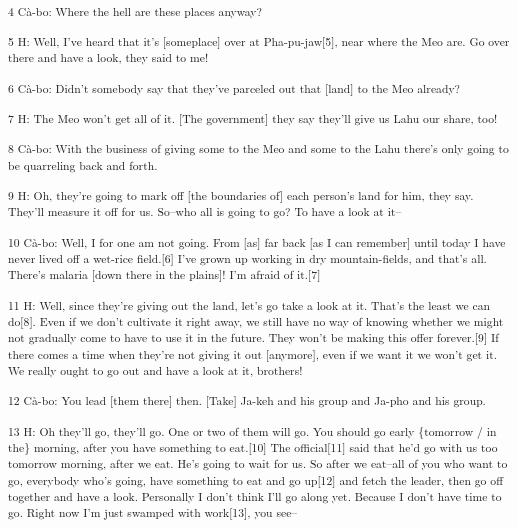 {\textsuperscript{4 Cà-bo: Where the hell are these places anyway?}}

{\textsuperscript{5 H: Well, I've heard that it's [someplace] over at Pha-pu-jaw[5],
near where the Meo are. Go over there and have a look, they said to me!}}

{\textsuperscript{6 Cà-bo: Didn't somebody say that they've parceled out
that [land] to the Meo already?}}

{\textsuperscript{7 H: The Meo won't get all of it. [The government] they
say they'll give us Lahu our share, too! }}

{\textsuperscript{8 Cà-bo: With the business of giving some to the Meo
and some to the Lahu there's only going to be quarreling back and forth.}}

{\textsuperscript{9 H: Oh, they're going to mark off [the boundaries of]
each person's land for him, they say. They'll measure it off for us. So--who all
is going to go? To have a look at it--}}

{\textsuperscript{10 Cà-bo: Well, I for one am not going. From [as] far
back [as I can remember] until today I have never lived off a wet-rice field.[6]
I've grown up working in dry mountain-fields, and that's all. There's malaria [down
there in the plains]! I'm afraid of it.[7]}}

{\textsuperscript{11 H: Well, since they're giving out the land, let's go
take a look at it. That's the least we can do[8]. Even if we don't cultivate it
right away, we still have no way of knowing whether we might not gradually come
to have to use it in the future. They won't be making this offer forever.[9] If
there comes a time when they're not giving it out [anymore], even if we want it
we won't get it. We really ought to go out and have a look at it, brothers!}}

{\textsuperscript{12 Cà-bo: You lead [them there] then. [Take] Ja-keh and
his group and Ja-pho and his group.}}

{\textsuperscript{13 H: Oh they'll go, they'll go. One or two of them will
go. You should go early \{tomorrow / in the\} morning, after you have something
to eat.[10] The official[11] said that he'd go with us too tomorrow morning, after
we eat. He's going to wait for us. So after we eat--all of you who want to go,
everybody who's going, have something to eat and go up[12] and fetch the leader,
then go off together and have a look. Personally I don't think I'll go along yet.
Because I don't have time to go. Right now I'm just swamped with work[13], you
see--}}

